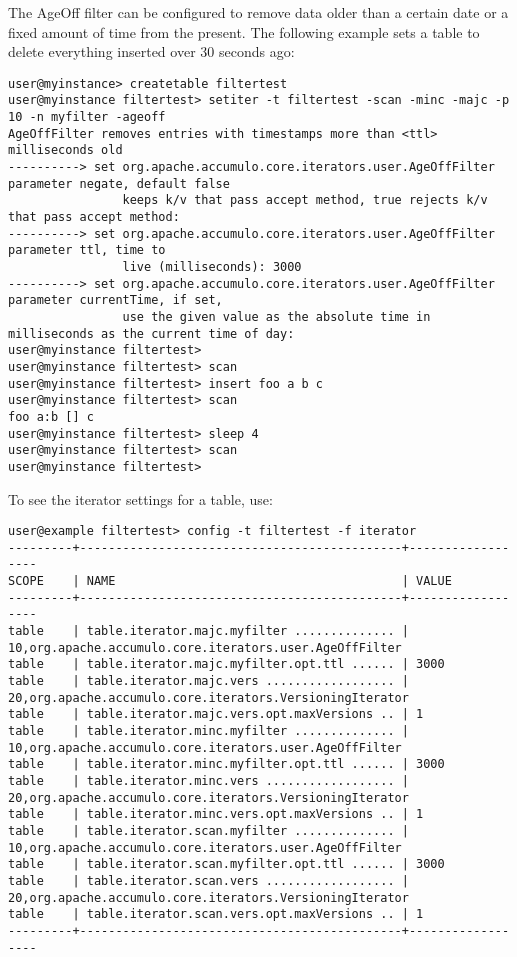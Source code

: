 The AgeOff filter can be configured to remove data older than a certain date or a fixed
amount of time from the present. The following example sets a table to delete
everything inserted over 30 seconds ago:

\begingroup\fontsize{8pt}{8pt}\selectfont\begin{verbatim}
user@myinstance> createtable filtertest
user@myinstance filtertest> setiter -t filtertest -scan -minc -majc -p 10 -n myfilter -ageoff
AgeOffFilter removes entries with timestamps more than <ttl> milliseconds old
----------> set org.apache.accumulo.core.iterators.user.AgeOffFilter parameter negate, default false
                keeps k/v that pass accept method, true rejects k/v that pass accept method: 
----------> set org.apache.accumulo.core.iterators.user.AgeOffFilter parameter ttl, time to
                live (milliseconds): 3000
----------> set org.apache.accumulo.core.iterators.user.AgeOffFilter parameter currentTime, if set,
                use the given value as the absolute time in milliseconds as the current time of day: 
user@myinstance filtertest> 
user@myinstance filtertest> scan
user@myinstance filtertest> insert foo a b c
user@myinstance filtertest> scan
foo a:b [] c
user@myinstance filtertest> sleep 4
user@myinstance filtertest> scan
user@myinstance filtertest>
\end{verbatim}\endgroup

To see the iterator settings for a table, use:

\begingroup\fontsize{8pt}{8pt}\selectfont\begin{verbatim}
user@example filtertest> config -t filtertest -f iterator
---------+---------------------------------------------+------------------
SCOPE    | NAME                                        | VALUE
---------+---------------------------------------------+------------------
table    | table.iterator.majc.myfilter .............. | 10,org.apache.accumulo.core.iterators.user.AgeOffFilter
table    | table.iterator.majc.myfilter.opt.ttl ...... | 3000
table    | table.iterator.majc.vers .................. | 20,org.apache.accumulo.core.iterators.VersioningIterator
table    | table.iterator.majc.vers.opt.maxVersions .. | 1
table    | table.iterator.minc.myfilter .............. | 10,org.apache.accumulo.core.iterators.user.AgeOffFilter
table    | table.iterator.minc.myfilter.opt.ttl ...... | 3000
table    | table.iterator.minc.vers .................. | 20,org.apache.accumulo.core.iterators.VersioningIterator
table    | table.iterator.minc.vers.opt.maxVersions .. | 1
table    | table.iterator.scan.myfilter .............. | 10,org.apache.accumulo.core.iterators.user.AgeOffFilter
table    | table.iterator.scan.myfilter.opt.ttl ...... | 3000
table    | table.iterator.scan.vers .................. | 20,org.apache.accumulo.core.iterators.VersioningIterator
table    | table.iterator.scan.vers.opt.maxVersions .. | 1
---------+---------------------------------------------+------------------
\end{verbatim}\endgroup

